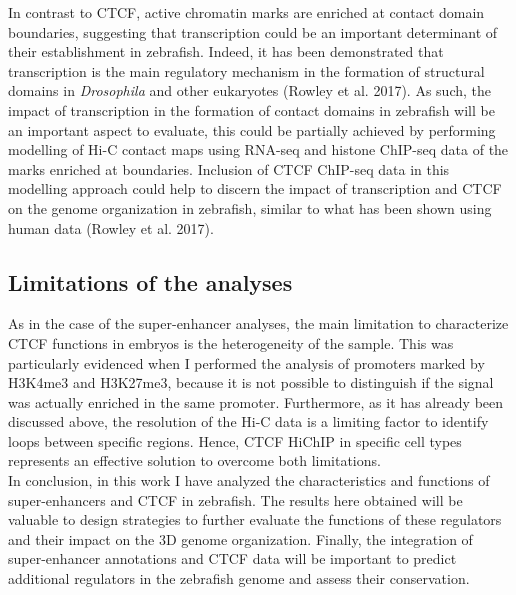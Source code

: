 In contrast to CTCF, active chromatin marks are enriched at contact domain boundaries, suggesting that transcription could be an important determinant of their establishment in zebrafish. Indeed, it has been demonstrated that transcription is the main regulatory mechanism in the formation of structural domains in \textit{Drosophila} and other eukaryotes (Rowley et al. 2017). As such, the impact of transcription in the formation of contact domains in zebrafish will be an important aspect to evaluate, this could be partially achieved by performing modelling of Hi-C contact maps using RNA-seq and histone ChIP-seq data of the marks enriched at boundaries. Inclusion of CTCF ChIP-seq data in this modelling approach could help to discern the impact of transcription and CTCF on the genome organization in zebrafish, similar to what has been shown using human data (Rowley et al. 2017).\\

		\subsection{Limitations of the analyses}

As in the case of the super-enhancer analyses, the main limitation to characterize CTCF functions in embryos is the heterogeneity of the sample. This was particularly evidenced when I performed the analysis of promoters marked by H3K4me3 and H3K27me3, because it is not possible to distinguish if the signal was actually enriched in the same promoter. Furthermore, as it has already been discussed above, the resolution of the Hi-C data is a limiting factor to identify loops between specific regions. Hence, CTCF HiChIP in specific cell types represents an effective solution to overcome both limitations.\\

In conclusion, in this work I have analyzed the characteristics and functions of super-enhancers and CTCF in zebrafish. The results here obtained will be valuable to design strategies to further evaluate the functions of these regulators and their impact on the 3D genome organization. Finally, the integration of super-enhancer annotations and CTCF data will be important to predict additional regulators in the zebrafish genome and assess their conservation.\\



